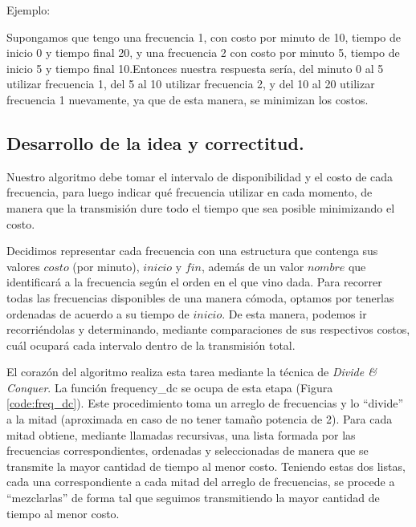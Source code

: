 Ejemplo:

Supongamos que tengo una frecuencia 1, con costo por minuto de 10, tiempo de inicio 0 y tiempo final 20, y una frecuencia 2 con costo por minuto 5, tiempo de inicio 5 y tiempo final 10.Entonces nuestra respuesta sería, del minuto 0 al 5 utilizar frecuencia 1, del 5 al 10 utilizar frecuencia 2, y del 10 al 20 utilizar frecuencia 1 nuevamente, ya que de esta manera, se minimizan los costos.



\vspace*{0.6cm}

\subsection{Desarrollo de la idea y correctitud.}

\vspace*{0.3cm}

Nuestro algoritmo debe tomar el intervalo de disponibilidad y el costo de cada frecuencia, para luego indicar qué frecuencia utilizar en cada momento, de manera que la transmisión dure todo el tiempo que sea posible minimizando el costo.

Decidimos representar cada frecuencia con una estructura que contenga sus valores $costo$ (por minuto), $inicio$ y $fin$, además de un valor $nombre$ que identificará a la frecuencia según el orden en el que vino dada.  Para recorrer todas las frecuencias disponibles de una manera cómoda, optamos por tenerlas ordenadas de acuerdo  a su tiempo de $inicio$.  De esta manera, podemos ir recorriéndolas y determinando, mediante comparaciones de sus respectivos costos, cuál ocupará cada intervalo dentro de la transmisión total.

El corazón del algoritmo realiza esta tarea mediante la técnica de {\it Divide \& Conquer}.  La función {\sc frequency_dc} se ocupa de esta etapa (Figura \ref{code:freq_dc}).  Este procedimiento toma un arreglo de frecuencias y lo ``divide'' a la mitad (aproximada en caso de no tener tamaño potencia de 2).  Para cada mitad obtiene, mediante llamadas recursivas, una lista formada por las frecuencias correspondientes, ordenadas y seleccionadas de manera que se transmite la mayor cantidad de tiempo al menor costo.  Teniendo estas dos listas, cada una correspondiente a cada mitad del arreglo de frecuencias, se procede a ``mezclarlas'' de forma tal que seguimos transmitiendo la mayor cantidad de tiempo al menor costo.


